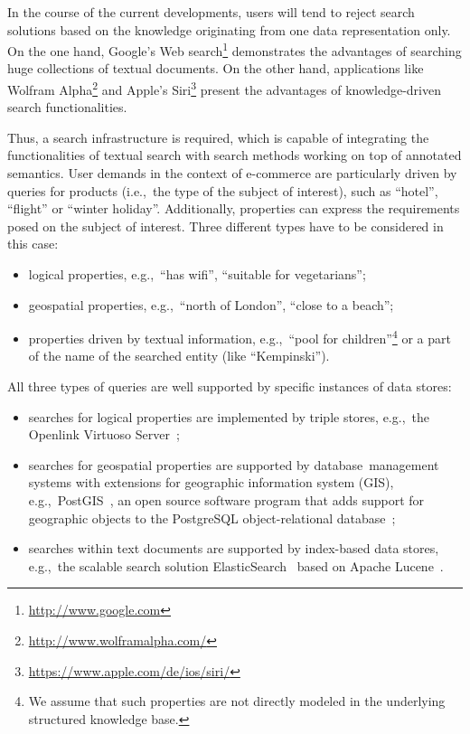 \documentclass{acm_proc_article-sp}
\newcommand{\eg}{e.g.,~}
\newcommand{\ie}{i.e.,~}
\begin{document}
In the course of the current developments, users will tend to reject search solutions based on the knowledge originating from one data representation only. 
On the one hand, Google's Web search\footnote{\url{http://www.google.com}} demonstrates the advantages of searching huge collections of textual documents. 
On the other hand, applications like Wolfram Alpha\footnote{\url{http://www.wolframalpha.com/}} and Apple's Siri\footnote{\url{https://www.apple.com/de/ios/siri/}} present the advantages of knowledge-driven search functionalities.

Thus, a search infrastructure is required, which is capable of integrating the functionalities of textual search with search methods working on top of annotated semantics. 
User demands in the context of e-commerce are particularly driven by queries for products (\ie the type of the subject of interest), such as ``hotel'', ``flight'' or ``winter holiday''.
Additionally, properties can express the requirements posed on the subject of interest. 
Three different types have to be considered in this case:
\begin{itemize}
\item logical properties, \eg ``has wifi'', ``suitable for vegetarians'';
\item geospatial properties, \eg ``north of London'', ``close to a beach'';
\item properties driven by textual information, \eg ``pool for children''\footnote{We assume that such properties are not directly modeled in the underlying structured knowledge base.} or a part of the name of the searched entity (like ``Kempinski'').
\end{itemize}

All three types of queries are well supported by specific instances of data stores:

\begin{itemize}
\item searches for logical properties are implemented by triple stores, \eg the Openlink Virtuoso Server~\cite{erling2009rdf};
\item searches for geospatial properties are supported by data\-base\ management systems with extensions for geo\-gra\-phic information system (GIS), \eg PostGIS~\cite{obe2011postgis}, an open source software program that adds support for geographic objects to the PostgreSQL object-relational database~\cite{momjian2001postgresql};
\item searches within text documents are supported by index-based data stores, \eg the scalable search solution ElasticSearch~\cite{kuc2013elasticsearch} based on Apache Lucene~\cite{hatcher2004lucene}.
\end{itemize}
\end{document}
